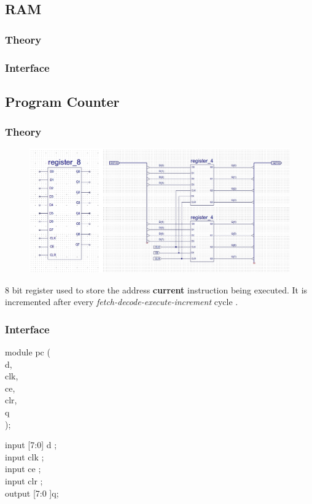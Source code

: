 \documentclass[11pt]{article}
\begin{document}
\subsection{RAM}
\label{sec:org9ca0800}
\subsubsection{Theory}
\label{sec:org2546f1f}
\subsubsection{Interface}
\label{sec:org2329f18}
\subsection{Program Counter}
\label{sec:orgd901d66}
\subsubsection{Theory}
\label{sec:orga91ccac}
\begin{figure}[htbp]
\centering
\includegraphics[width=.9\linewidth]{./images/reg8.jpg}
\caption{\label{fig:org44c72d1}
}
\end{figure}
8 bit register used to store the address \textbf{current} instruction being executed.
It is incremented after every \emph{fetch-decode-execute-increment} cycle .
\subsubsection{Interface}
\label{sec:orgbe15afa}
module pc (\\
d,\\
clk,\\
ce,\\
clr,\\
q\\
);

input [7:0] d     ; \\
input clk         ;   \\
input ce      ; \\
input clr     ; \\
output [7:0 ]q; \\
\end{document}
